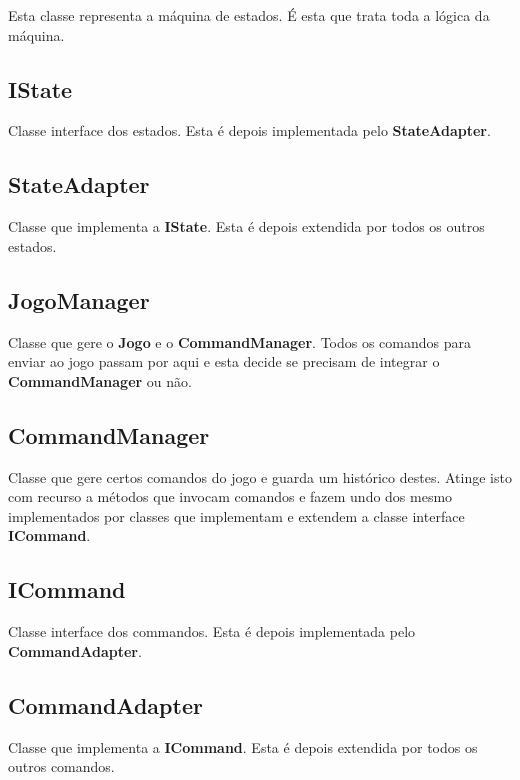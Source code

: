 \documentclass[11pt]{article}
\begin{document}
	Esta classe representa a máquina de estados. É esta que trata toda a lógica da máquina.
	
	
	\large
	\subsection{IState}
	\normalsize
	
	Classe interface dos estados. Esta é depois implementada pelo \textbf{StateAdapter}.
	
	
	\large
	\subsection{StateAdapter}
	\normalsize
	
	Classe que implementa a \textbf{IState}. Esta é depois extendida por todos os outros estados.
	
	
	\large
	\subsection{JogoManager}
	\normalsize
	
	Classe que gere o \textbf{Jogo} e o \textbf{CommandManager}. Todos os comandos para enviar ao jogo passam por aqui e esta decide se precisam de integrar o \textbf{CommandManager} ou não.
	
	
	\large
	\subsection{CommandManager}
	\normalsize
	
	Classe que gere certos comandos do jogo e guarda um histórico destes. Atinge isto com recurso a métodos que invocam comandos e fazem undo dos mesmo implementados por classes que implementam e extendem a classe interface \textbf{ICommand}.
	
	
	\large
	\subsection{ICommand}
	\normalsize
	
	Classe interface dos commandos. Esta é depois implementada pelo \textbf{CommandAdapter}.
	
	
	\large
	\subsection{CommandAdapter}
	\normalsize
	
	Classe que implementa a \textbf{ICommand}. Esta é depois extendida por todos os outros comandos.
	
\end{document}
